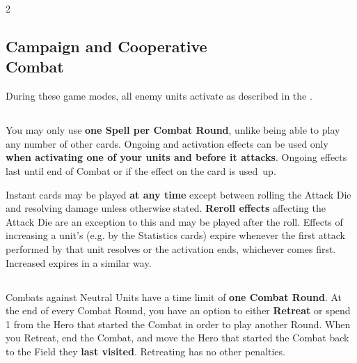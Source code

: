 \begin{multicols*}{2}
\subsection*{Campaign and Cooperative\\Combat}
During these game modes, all enemy units activate as described in the .
\vspace*{\fill}

\subsection*{}
You may only use \textbf{one Spell per Combat Round}, unlike being able to play any number of other cards.
Ongoing  and  activation effects can be used only \textbf{when activating one of your units and before it attacks}.
Ongoing effects last until end of Combat or if the effect on the card is used~up.\par
Instant  cards may be played \textbf{at any time} except between rolling the Attack Die and resolving damage unless otherwise stated.
\textbf{Reroll effects} affecting the Attack Die are an exception to this and may be played after the roll.
Effects of increasing a unit's  (e.g. by the Statistics cards) expire whenever the first attack performed by that unit resolves or the activation ends, whichever comes first.
Increased  expires in a similar way.

\vspace*{\fill}

\subsection*{}
Combats against Neutral Units have a time limit of \textbf{one Combat Round}.
At the end of every Combat Round, you have an option to either \textbf{Retreat} or spend 1  from the Hero that started the Combat in order to play another Round.
When you Retreat, end the Combat, and move the Hero that started the Combat back to the Field they \textbf{last visited}.
Retreating has no other penalties.

\end{multicols*}

